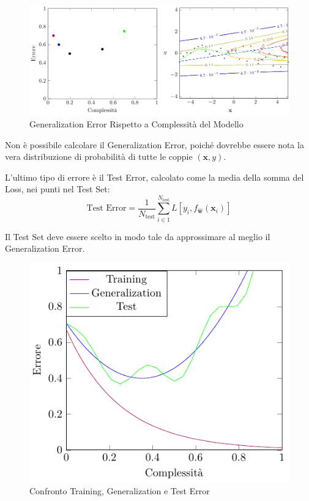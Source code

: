 \documentclass{article}
\numberwithin{equation}{subsection}
\newcommand{\vect}[1]{\boldsymbol{\mathbf{#1}}}
\begin{document}
\begin{figure}[H]%
    \centering%
    \includegraphics[scale=0.65]{generalization_error_confronto.pdf}%
    \caption{Generalization Error Rispetto a Complessità del Modello}%
\end{figure}

Non è possibile calcolare il Generalization Error, poiché dovrebbe essere nota la vera distribuzione di probabilità di tutte le coppie $(\vect{x}, y)$. 

L'ultimo tipo di errore è il Test Error, calcolato come la media della somma del Loss, nei 
punti nel Test Set:
\begin{equation}
    \text{Test Error}=\displaystyle\frac{1}{N_\text{test}}\sum_{i\in1}^{N_{\text{test}}}L[y_i,f_{\vect{\hat{w}}}(\vect{x}_i)]
\end{equation}

Il Test Set deve essere scelto in modo tale da approssimare al meglio il Generalization Error. 

\begin{figure}[H]%
    \centering%
    \includegraphics[scale=0.6]{confronto_errori.pdf}%
    \caption{Confronto Training, Generalization e Test Error}%
\end{figure}
\end{document}
